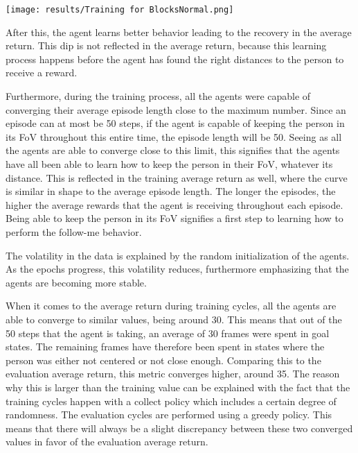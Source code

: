 \begin{Figure}
    \centering
    \texttt{[image: results/Training for BlocksNormal.png]}
    \label{im:NormalTraining}
\end{Figure}

\noindent 
After this, the agent learns better behavior leading to the recovery in the average return.
This dip is not reflected in the average return, because this learning process happens 
before the agent has found the right distances to the person to receive a reward.

Furthermore, during the training process, all the agents were capable 
of converging their average episode length close to the maximum number. Since an episode can 
at most be 50 steps, if the agent is capable of keeping the person in its FoV throughout 
this entire time, the episode length will be 50. Seeing as all the agents are 
able to converge close to this limit, this signifies that the agents have all been able to 
learn how to keep the person in 
their FoV, whatever its distance.
This is reflected 
in the training average return as well, where the curve is similar in shape 
to the average episode length. The longer the episodes, the higher the average rewards that the 
agent is receiving throughout each episode. Being able to 
keep the person in its FoV signifies a first step to learning how to perform the follow-me 
behavior. 

The volatility in the data is explained by the random initialization of the agents. As 
the epochs progress, this volatility reduces, furthermore emphasizing that the agents are 
becoming more stable. 

When it comes to the average return during training cycles, all the agents are able to 
converge to similar values, being around 30. This means that 
out of the 50 steps that the agent is taking, an average of 30 frames were spent in 
goal states. The remaining frames have therefore been spent in states where the person 
was either not centered or not close enough. Comparing this to the evaluation average return, 
this metric converges higher, around 35. The reason 
why this is larger than the training value can be explained with the fact that the 
training cycles happen with a collect policy which includes a certain degree of randomness.
The evaluation cycles are performed using a greedy policy. This means that 
there will always be a slight discrepancy between these two converged values in favor 
of the evaluation average return.  

